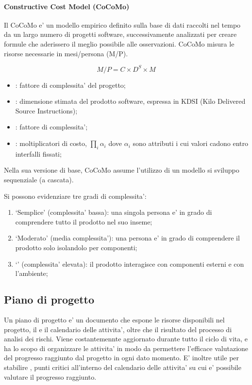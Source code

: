 \paragraph{Constructive Cost Model (CoCoMo)}

Il CoCoMo e' un modello empirico definito sulla base di dati raccolti nel tempo
da un largo numero di progetti software, successivamente analizzati per creare
formule che aderissero il meglio possibile alle osservazioni. CoCoMo misura le
risorse necessarie in mesi/persona (M/P).

\[
  M/P = C \times D^S \times M
\]

\begin{itemize}
  \item {}: fattore di complessita' del progetto;
  \item {}: dimensione stimata del prodotto software, espressa in KDSI
    (Kilo Delivered Source Instructions);
  \item {}: fattore di complessita';
  \item {}: moltiplicatori di costo, $\prod_i \alpha_i$ dove $\alpha_i$
    sono attributi i cui valori cadono entro interfalli fissati;
\end{itemize}

Nella sua versione di base, CoCoMo assume l'utilizzo di un modello si sviluppo
sequenziale (a cascata). 

Si possono evidenziare tre gradi di complessita':

\begin{enumerate}
  \item `Semplice' (complessita' bassa): una singola persona e' in grado di
    comprendere tutto il prodotto nel suo inseme;
  \item `Moderato' (media complessita'): una persona e' in grado di comprendere
    il prodotto solo isolandolo per componenti;
  \item `' (complessita' elevata): il prodotto interagisce
    con componenti esterni e con l'ambiente;
\end{enumerate}


\subsection{Piano di progetto}

Un piano di progetto e' un documento che espone le risorse disponibili nel
progetto, il  e il calendario delle attivita', oltre
che il risultato del processo di analisi dei rischi. Viene costantemennte
aggiornato durante tutto il ciclo di vita, e ha lo scopo di organizzare le
attivita' in modo da permettere l'efficace valutazione del progresso raggiunto
dal progetto in ogni dato momento. E' inoltre utile per stabilire
, punti critici all'interno del calendario delle attivita'
su cui e' possibile valutare il progresso raggiunto.

